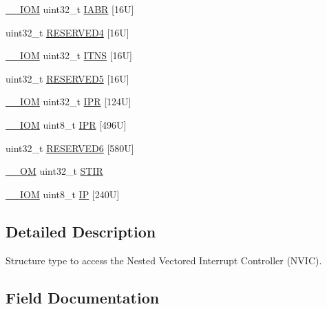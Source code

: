 \begin{DoxyCompactItemize}
\item 
\mbox{\hyperlink{core__cm4_8h_ab6caba5853a60a17e8e04499b52bf691}{\+\_\+\+\_\+\+I\+OM}} uint32\+\_\+t \mbox{\hyperlink{struct_n_v_i_c___type_a12dfc70e0aa06804ff91817c6a3c7d6e}{I\+A\+BR}} \mbox{[}16\+U\mbox{]}
\item 
uint32\+\_\+t \mbox{\hyperlink{struct_n_v_i_c___type_a0701d75c5b133d8d5a4436097a202236}{R\+E\+S\+E\+R\+V\+E\+D4}} \mbox{[}16\+U\mbox{]}
\item 
\mbox{\hyperlink{core__cm4_8h_ab6caba5853a60a17e8e04499b52bf691}{\+\_\+\+\_\+\+I\+OM}} uint32\+\_\+t \mbox{\hyperlink{struct_n_v_i_c___type_addfcdde1da9ca4b87b4b8068b5df0dda}{I\+T\+NS}} \mbox{[}16\+U\mbox{]}
\item 
uint32\+\_\+t \mbox{\hyperlink{struct_n_v_i_c___type_abd5ef8d9e3caace25094ac684840b270}{R\+E\+S\+E\+R\+V\+E\+D5}} \mbox{[}16\+U\mbox{]}
\item 
\mbox{\hyperlink{core__cm4_8h_ab6caba5853a60a17e8e04499b52bf691}{\+\_\+\+\_\+\+I\+OM}} uint32\+\_\+t \mbox{\hyperlink{struct_n_v_i_c___type_a5a3763fa8e079c90b6a8e09c0587eef4}{I\+PR}} \mbox{[}124\+U\mbox{]}
\item 
\mbox{\hyperlink{core__cm4_8h_ab6caba5853a60a17e8e04499b52bf691}{\+\_\+\+\_\+\+I\+OM}} uint8\+\_\+t \mbox{\hyperlink{struct_n_v_i_c___type_a18075001dceea9f3e328ab5db42c4caf}{I\+PR}} \mbox{[}496\+U\mbox{]}
\item 
uint32\+\_\+t \mbox{\hyperlink{struct_n_v_i_c___type_acb585896a27b49f84d9d0decf874d452}{R\+E\+S\+E\+R\+V\+E\+D6}} \mbox{[}580\+U\mbox{]}
\item 
\mbox{\hyperlink{core__cm4_8h_a0ea2009ed8fd9ef35b48708280fdb758}{\+\_\+\+\_\+\+OM}} uint32\+\_\+t \mbox{\hyperlink{struct_n_v_i_c___type_ada9cbba14ab1cc3fddd585f870932db8}{S\+T\+IR}}
\item 
\mbox{\hyperlink{core__cm4_8h_ab6caba5853a60a17e8e04499b52bf691}{\+\_\+\+\_\+\+I\+OM}} uint8\+\_\+t \mbox{\hyperlink{struct_n_v_i_c___type_a4fda947a8fd3237a89d43b7d5a1057cb}{IP}} \mbox{[}240\+U\mbox{]}
\end{DoxyCompactItemize}


\subsection{Detailed Description}
Structure type to access the Nested Vectored Interrupt Controller (N\+V\+IC). 

\subsection{Field Documentation}
\mbox{\label{struct_n_v_i_c___type_a12dfc70e0aa06804ff91817c6a3c7d6e}} 
